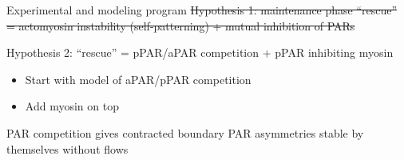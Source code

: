 \documentclass{beamer}
\newcommand{\6}[1]{#1_{\text{6}}}
\newcommand{\3}[1]{#1_{\text{3}}}
\begin{document}
\begin{frame}{Experimental and modeling program}
\st{Hypothesis 1: maintenance phase ``rescue'' = actomyosin instability (self-patterning) + mutual inhibition of PARs}

\vspace{0.5 cm}

Hypothesis 2: ``rescue'' = pPAR/aPAR competition + pPAR inhibiting myosin 
\begin{itemize}
\item Start with model of aPAR/pPAR competition
\item Add myosin on top
\end{itemize}
\end{frame}

\begin{frame}{PAR competition gives contracted boundary}
PAR asymmetries stable by themselves without flows


\end{frame}
\end{document}
